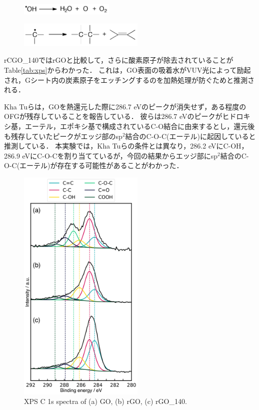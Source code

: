 \documentclass[platex,dvipdfmx]{jlreq}			%
\begin{document}
\begin{figure}[H]
    \centering
    \includegraphics[width=45mm]{figures/fig_equation4.png}
    \label{fig:equation4}
\end{figure}

\begin{figure}[H]
    \centering
    \includegraphics[width=60mm]{figures/fig_equation5.png}
    \label{fig:equation5}
\end{figure}

rCGO\_140ではrGOと比較して，さらに酸素原子が除去されていることがTable\ref{tab:xps}からわかった．
これは，GO表面の吸着水がVUV光によって励起され，Gシート内の炭素原子をエッチングするのを加熱処理が防ぐためと推測される．

\indent
Kha Tuらは，GOを熱還元した際に286.7 eVのピークが消失せず，ある程度のOFGが残存していることを報告している\supercite{tu_remarkable_2015}．
彼らは286.7 eVのピークがヒドロキシ基，エーテル，エポキシ基で構成されているC-O結合に由来するとし，還元後も残存していたピークがエッジ部のsp$^2$結合のC-O-C(エーテル)に起因していると推測している．
本実験では，Kha Tuらの条件とは異なり，286.2 eVにC-OH，286.9 eVにC-O-Cを割り当てているが，今回の結果からエッジ部にsp$^2$結合のC-O-C(エーテル)が存在する可能性があることがわかった．

\begin{figure}[H]
    \centering
    \includegraphics[width=60mm]{figures/figure3.png}
    \caption{XPS C 1s spectra of (a) GO, (b) rGO, (c) rGO\_140.}
    \label{fig:XPS}
\end{figure}
\end{document}
